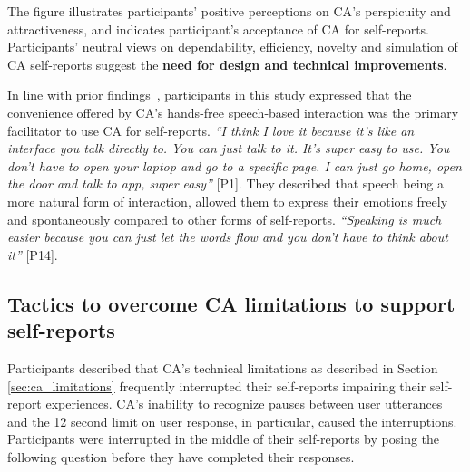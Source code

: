         The figure illustrates participants' positive perceptions on \ac{CA}'s perspicuity and attractiveness, and indicates participant's acceptance of \ac{CA} for self-reports. 
        Participants' neutral views on dependability, efficiency, novelty and simulation of \ac{CA} self-reports suggest the \textbf{need for design and technical improvements}. 
        
        In line with prior findings~\cite{lau2018alexa, Rafal2018Workplace}, participants in this study expressed that the convenience offered by \ac{CA}'s hands-free speech-based interaction was the primary facilitator to use \ac{CA} for self-reports.
            \textit{``I think I love it because it’s like an interface you talk directly to. You can just talk to it. It’s super easy to use. You don’t have to open your laptop and go to a specific page. I can just go home, open the door and talk to \acl{app}, super easy''} [P1].
        They described that speech being a more natural form of interaction, allowed them to express their emotions freely and spontaneously compared to other forms of self-reports. 
            \textit{``Speaking is much easier because you can just let the words flow and you don't have to think about it''} [P14].
        
    \subsection{Tactics to overcome \ac{CA} limitations to support self-reports}
        Participants described that \ac{CA}'s technical limitations as described in Section \ref{sec:ca_limitations}
        frequently interrupted their self-reports impairing their self-report experiences.
        \ac{CA}'s inability to recognize pauses between user utterances and the 12 second limit on user response, in particular, caused the interruptions. 
        Participants were interrupted in the middle of their self-reports by posing the following question before they have completed their responses.        
        
